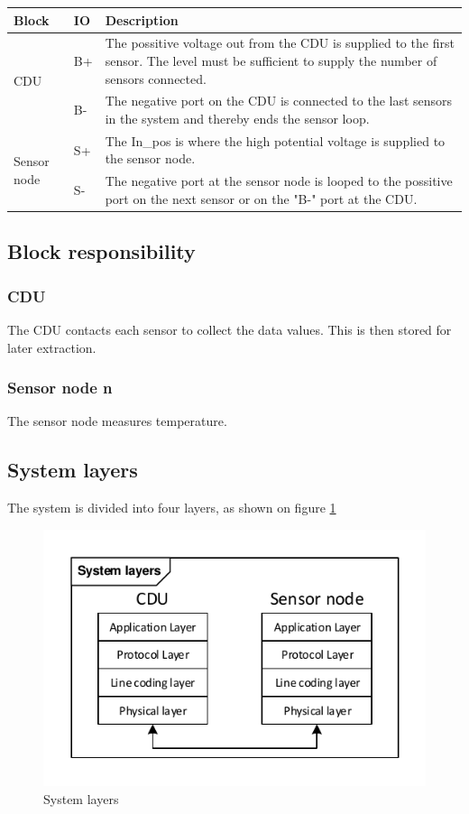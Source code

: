 \begin{table}[H]
	\begin{center}
		\begin{tabular}{|p{2.5cm}|p{1cm}| p{9cm}| }
			\hline
			\textbf{Block} & \textbf{IO} & \textbf{Description} \\\hline
			\multirow{2}{2.5cm}[-2em]{CDU} & B+& The possitive voltage out from the CDU is supplied to the first sensor. The level must be sufficient to supply the number of sensors connected.\\ \cline{2-3}
 & B-  & The negative port on the CDU is connected to the last sensors in the system and thereby ends the sensor loop. \\ \hline
			\multirow{2}{2.5cm}[-2em]{Sensor node} & S+ &The In\_pos is where the high potential voltage is supplied to the sensor node. \\ \cline{2-3}
& S- & The negative port at the sensor node is looped to the possitive port on the next sensor or on the "B-" port at the CDU. \\ \hline
		\end{tabular}
	\end{center}
\end{table}

\subsection{Block responsibility}
\subsubsection{CDU}
The CDU contacts each sensor to collect the data values. This is then stored for later extraction.

\subsubsection{Sensor node n}
The sensor node measures temperature.

\subsection{System layers}
The system is divided into four layers, as shown on figure \ref{fig:system_layers}

\begin{figure}[H]
	\centering
	\includegraphics[width=.7\textwidth]{billeder/system_layers}
	\caption{System layers}
	\label{fig:system_layers}
\end{figure}


